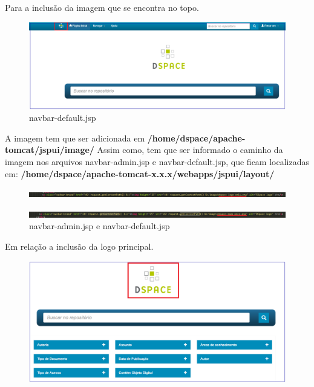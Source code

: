 \documentclass[12pt,hidelinks]{article}
\begin{document}
Para a inclusão da imagem que se encontra no topo.

\begin{figure}[!htp]
        \centering
        \includegraphics[scale=0.5]{figura/logo-topo.png}
        \caption{navbar-default.jsp}
        \label{Rotulo}
    \end{figure}
    
A imagem tem que ser adicionada em \textbf{/home/dspace/apache-tomcat/jspui/image/}  
\singlespacing
Assim como, tem que ser informado o caminho da imagem nos arquivos navbar-admin.jsp e navbar-default.jsp, que ficam localizadas em: \textbf{/home/dspace/apache-tomcat-x.x.x/webapps/jspui/layout/}  

\begin{figure}[!htp]
        \centering
        \includegraphics[scale=0.3]{figura/dspace-logo-only1.png}
        \label{Rotulo}
    \end{figure}
    
\begin{figure}[!htp]
        \centering
        \includegraphics[scale=0.3]{figura/dspace-logo-only2.png}
        \caption{navbar-admin.jsp e navbar-default.jsp}
        \label{Rotulo}
    \end{figure}

Em relação a inclusão da logo principal.
\begin{figure}[!htp]
        \centering
        \includegraphics[scale=0.5]{figura/logo-principal.png}
        \caption{}
        \label{Rotulo}
    \end{figure}
    
\end{document}

